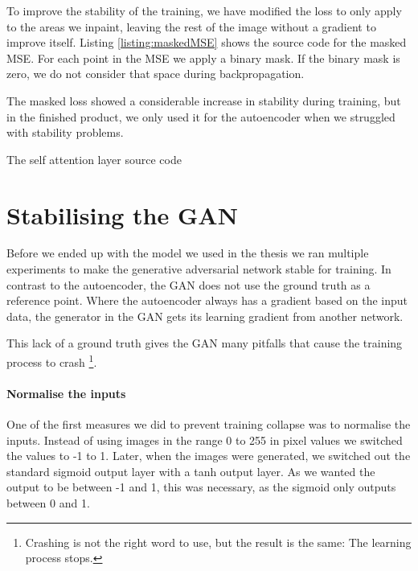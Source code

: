 To improve the stability of the training, we have modified the loss to only apply to the areas we inpaint, leaving the rest of the image without a gradient to improve itself. Listing \ref{listing:maskedMSE} shows the source code for the masked MSE. 
For each point in the MSE we apply a binary mask. If the binary mask is zero, we do not consider that space during backpropagation.


The masked loss showed a considerable increase in stability during training, but in the finished product, we only used it for the autoencoder when we struggled with stability problems.

\begin{minipage}{\linewidth}
\begin{listing}

\caption{The self attention layer source code}
\label{listing:maskedMSE}
\end{listing}
\end{minipage}





\section{Stabilising the GAN}
Before we ended up with the model we used in the thesis we ran multiple experiments to make the generative adversarial network stable for training.  In contrast to the autoencoder, the GAN does not use the ground truth as a reference point. Where the autoencoder always has a gradient based on the input data, the generator in the GAN gets its learning gradient from another network.

This lack of a ground truth gives the GAN many pitfalls that cause the training process to crash \footnote{Crashing is not the right word to use, but the result is the same: The learning process stops.}.


\paragraph{Normalise the inputs}
One of the first measures we did to prevent training collapse was to normalise the inputs. Instead of using images in the range 0 to 255 in pixel values we switched the values to  -1 to 1. 
Later, when the images were generated, we switched out the standard sigmoid output layer with a tanh output layer. As we wanted the output to be between -1 and 1, this was necessary, as the sigmoid only outputs between 0 and 1.

